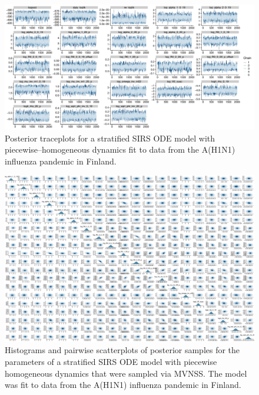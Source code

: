 \begin{figure}
	\centering
	\includegraphics[width=\linewidth]{figures/flu_traces_const_ode}
	\caption{Posterior traceplots for a stratified SIRS ODE model with piecewise--homogeneous dynamics fit to data from the A(H1N1) influenza pandemic in Finland.}
	\label{fig:fluconstodetraces}
\end{figure}


\begin{figure}
	\centering
	\includegraphics[width=\linewidth]{figures/flu_const_pairs}
	\caption{Histograms and pairwise scatterplots of posterior samples for the parameters of a stratified SIRS ODE model with piecewise homogeneous dynamics that were sampled via MVNSS. The model was fit to data from the A(H1N1) influenza pandemic in Finland.}
	\label{fig:fluconstpairs}
\end{figure}
